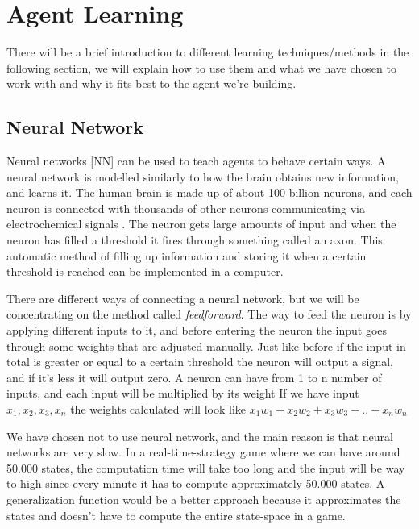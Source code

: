\section{Agent Learning}\label{agent_learning}

There will be a brief introduction to different learning techniques/methods in the following section, we will explain how to use them and what we have chosen to work with and why it fits best to the agent we're building. 

\subsection*{Neural Network}			 
			
Neural networks [NN] can be used to teach agents to behave certain ways.
A neural network is modelled similarly to how the brain obtains new information, and learns it. The human brain is made up of about 100 billion neurons, and each neuron is connected with thousands of other neurons communicating via electrochemical signals \cite{nn}. The neuron gets large amounts of input and when the neuron has filled a threshold it fires through something called an axon. This automatic method of filling up information and storing it when a certain threshold is reached can be implemented in a computer.

There are different ways of connecting a neural network, but we will be concentrating on the method called \textit{feedforward}. The way to feed the neuron is by applying different inputs to it, and before entering the neuron the input goes through some weights that are adjusted manually. Just like before if the input in total is greater or equal to a certain threshold the neuron will output a signal, and if it's less it will output zero.
A neuron can have from 1 to n number of inputs, and each input will be multiplied by its weight
If we have input $x_1, x_2, x_3, x_n$ the weights calculated will look like $x_1 w_1 + x_2 w_2 + x_3 w_3 + .. +  x_n w_n$


We have chosen not to use neural network, and the main reason is that neural networks are very slow. In a real-time-strategy game where we can have around 50.000 states, the computation time will take too long and the input will be way to high since every minute it has to compute approximately 50.000 states. A generalization function would be a better approach because it approximates the states and doesn't have to compute the entire state-space in a game. 


